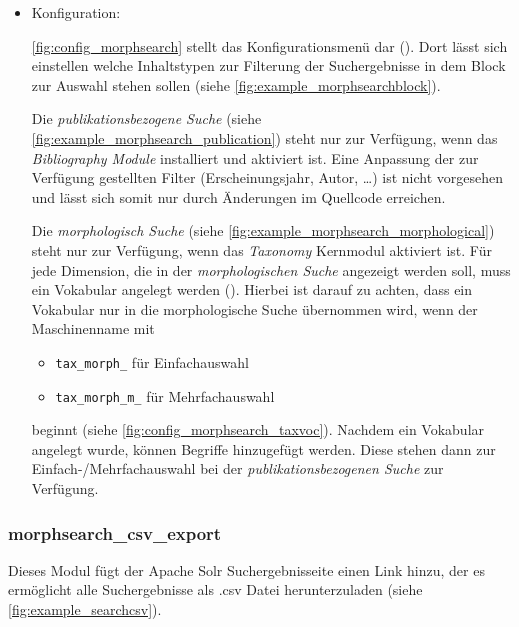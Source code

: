 \begin{itemize}[parsep=0pt, itemsep=5.0pt plus 2.0pt minus 1.0pt, leftmargin=*]
	\item Konfiguration:
	
	\cref{fig:config_morphsearch} stellt das Konfigurationsmenü dar (). Dort lässt sich einstellen welche Inhaltstypen zur Filterung der Suchergebnisse in dem Block zur Auswahl stehen sollen (siehe \cref{fig:example_morphsearchblock}).
	
	Die \textit{publikationsbezogene Suche} (siehe \cref{fig:example_morphsearch_publication}) steht nur zur Verfügung, wenn das \textit{Bibliography Module} installiert und aktiviert ist. Eine Anpassung der zur Verfügung gestellten Filter (Erscheinungsjahr, Autor, \dots) ist nicht vorgesehen und lässt sich somit nur durch Änderungen im Quellcode erreichen.
	
	Die \textit{morphologisch Suche} (siehe \cref{fig:example_morphsearch_morphological}) steht nur zur Verfügung, wenn das \textit{Taxonomy} Kernmodul aktiviert ist. Für jede Dimension, die in der \textit{morphologischen Suche} angezeigt werden soll, muss ein Vokabular angelegt werden (). Hierbei ist darauf zu achten, dass ein Vokabular nur in die morphologische Suche übernommen wird, wenn der Maschinenname mit
	\begin{itemize}
		\item \lstinline|tax_morph_| für Einfachauswahl
		\item \lstinline|tax_morph_m_| für Mehrfachauswahl
	\end{itemize}
	beginnt (siehe \cref{fig:config_morphsearch_taxvoc}). Nachdem ein Vokabular angelegt wurde, können Begriffe hinzugefügt werden. Diese stehen dann zur Einfach-/Mehrfachauswahl bei der \textit{publikationsbezogenen Suche} zur Verfügung.
	
\end{itemize}


\subsubsection{morphsearch\_csv\_export}\label{subsub:morphsearchcsv}

Dieses Modul fügt der Apache Solr Suchergebnisseite einen Link hinzu, der es ermöglicht alle Suchergebnisse als .csv Datei herunterzuladen (siehe \cref{fig:example_searchcsv}).

